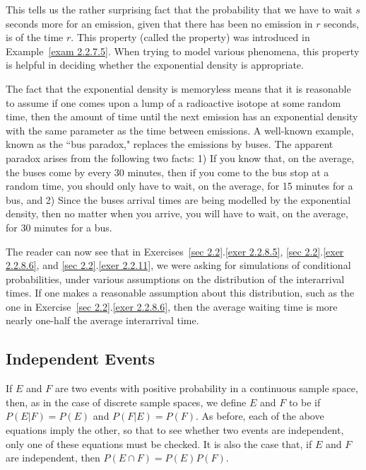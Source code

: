 \begin{example}
This tells us the rather surprising fact that the probability that we have to
wait $s$ seconds more for an emission, given that there has been no emission in $r$ seconds,
is  of the time $r$.  This property (called the  property) was introduced in Example~\ref{exam 2.2.7.5}. 
When trying to model various phenomena, this property is helpful in deciding whether the
exponential density is appropriate.  
\par
The fact that the exponential density is memoryless means that it is reasonable to assume
if one comes upon a lump of a radioactive isotope at some random time, then the amount of time
until the next emission has an exponential density with the same parameter as the time between
emissions.  A well-known example, known as the ``bus paradox," replaces the
emissions by buses.  The apparent paradox arises from the following two facts:  1) If you know that,
on the average, the buses come by every 30 minutes, then if you come to the bus stop at a random
time, you should only have to wait, on the average, for 15 minutes for a bus, and 2) Since the buses
arrival times are being modelled by the exponential density, then no matter when you arrive,
you will have to wait, on the average, for 30 minutes for a bus.
\par
The reader can now see that in Exercises~\ref{sec 2.2}.\ref{exer 2.2.8.5}, 
\ref{sec 2.2}.\ref{exer 2.2.8.6}, and \ref{sec 2.2}.\ref{exer
2.2.11}, we were asking for simulations of conditional probabilities, under various assumptions
on the distribution of the interarrival times.  If one makes a reasonable assumption about this
distribution, such as the one in Exercise~\ref{sec 2.2}.\ref{exer 2.2.8.6}, then the average 
waiting time is more nearly one-half the average interarrival time.
\end{example}

\subsection*{Independent Events}

If $E$ and $F$ are two events with positive probability in a continuous sample space, then, as in
the case of discrete sample spaces, we define $E$ and $F$ to be  if 
$P(E|F) = P(E)$ and $P(F|E) = P(F)$.  As before, each of the above equations imply the
other, so that to see whether two events are independent, only one of these equations must be
checked.  It is also the case that, if $E$ and $F$ are independent, then $P(E \cap F) = P(E)P(F)$.

